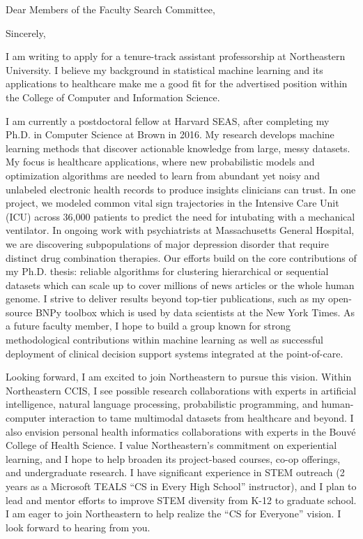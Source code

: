 \documentclass[11pt,letterpaper,roman]{moderncv}        %
\begin{document}
\date{\today}
\opening{Dear Members of the Faculty Search Committee,}
\closing{Sincerely,}

\makelettertitle

I am writing to apply for a tenure-track assistant professorship at Northeastern University. I believe my background in statistical machine learning and its applications to healthcare make me a good fit for the advertised position within the College of Computer and Information Science.

I am currently a postdoctoral fellow at Harvard SEAS, after completing my Ph.D. in Computer Science at Brown in 2016.
My research develops machine learning methods
that discover actionable knowledge from large, messy datasets. 
My focus is healthcare applications, where new probabilistic models and optimization algorithms are needed to learn from abundant yet noisy and unlabeled electronic health records to produce insights clinicians can trust.
In one project, we modeled common vital sign trajectories in the Intensive Care Unit (ICU) across 36,000 patients to predict the need for intubating with a mechanical ventilator. In ongoing work with psychiatrists at Massachusetts General Hospital, we are discovering subpopulations of major depression disorder that require distinct drug combination therapies. Our efforts build on the core contributions of my Ph.D. thesis: reliable algorithms for clustering hierarchical or sequential datasets which can scale up to cover millions of news articles or the whole human genome.
I strive to deliver results beyond top-tier publications, such as my open-source BNPy toolbox which is used by data scientists at the New York Times. As a future faculty member, I hope to build a group known for strong methodological contributions within machine learning as well as successful deployment of clinical decision support systems integrated at the point-of-care.

Looking forward, I am excited to join Northeastern to pursue this vision.
Within Northeastern CCIS, I see possible research collaborations with experts in artificial intelligence, natural language processing, probabilistic programming, and human-computer interaction to tame 
multimodal datasets from healthcare and beyond. 
I also envision personal health informatics collaborations with experts in the Bouvé College of Health Science.
I value Northeastern's commitment on experiential learning, and I hope to help broaden its project-based courses, co-op offerings, and undergraduate research.
I have significant experience in STEM outreach (2 years as a Microsoft TEALS ``CS in Every High School'' instructor), and I plan to lead and mentor efforts to improve STEM diversity from K-12 to graduate school.
I am eager to join Northeastern to help realize the ``CS for Everyone'' vision. I look forward to hearing from you.

\makeletterclosing
\end{document}

